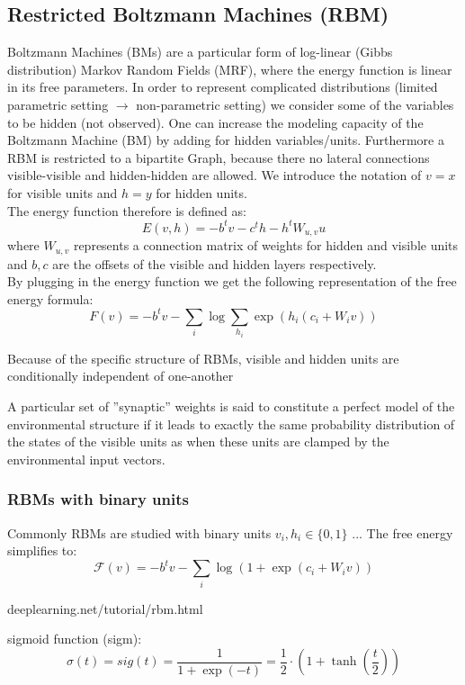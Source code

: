 \documentclass[11pt]{article}
\begin{document}
\subsection{Restricted Boltzmann Machines (RBM)}
Boltzmann Machines (BMs) are a particular form of log-linear (Gibbs distribution) Markov Random Fields (MRF), where the energy function is linear in its free parameters. In order to represent complicated distributions (limited parametric setting $\rightarrow$ non-parametric setting) we consider some of the variables to be hidden (not observed). One can increase the modeling capacity of the Boltzmann Machine (BM) by adding for hidden variables/units. Furthermore a RBM is restricted to a bipartite Graph, because there no lateral connections visible-visible and hidden-hidden are allowed. We introduce the notation of $v=x$ for visible units and $h=y$ for hidden units.\\
The energy function therefore is defined as:
\[
	E(v,h)=-b^{t}v-c^{t}h-h^{t}W_{u,v}u
\]
where $W_{u,v}$ represents a connection matrix of weights for hidden and visible units and $b,c$ are the offsets of the visible and hidden layers respectively.\\
By plugging in the energy function we get the following representation of the free energy formula:\\
\[
	F(v)=-b^{t}v-\sum_i\log\sum_{h_i} \exp(h_i(c_i+W_iv))
\]

Because of the specific structure of RBMs, visible and hidden units are conditionally independent of one-another 

A particular set of ''synaptic'' weights is said to constitute a perfect model of the environmental structure if it leads to exactly the same probability distribution of the states of the visible units as when these units are clamped by the environmental input vectors.

\subsubsection*{RBMs with binary units}
Commonly RBMs are studied with binary units $v_i, h_i \in \{0,1\}$ ...
The free energy simplifies to:\\
\[
	\mathcal{F}(v)=-b^{t}v-\sum_i\log(1+\exp(c_i+W_iv))
\]

deeplearning.net/tutorial/rbm.html

sigmoid function (sigm):
\[
	\sigma(t)=sig(t)=\frac{1}{1+\exp(-t)}=\frac{1}{2}\cdot(1+\tanh(\frac{t}{2}))
\]
\end{document}
